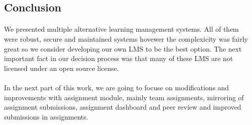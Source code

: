 \subsection{Conclusion}

\paragraph{}
We presented multiple alternative learning management systems. All of them were robust, secure and maintained systems hovewer the complexicity was fairly great so we consider developing our own LMS to be the best option. The next important fact in our decision process was that many of these LMS are not licensed under an open source license.

\paragraph{}
In the next part of this work, we are going to focuse on modifications and improvements with assignment module, mainly team assignments, mirroring of assignment submissions, assignment dashboard and peer review and improved submissions in assignments.
